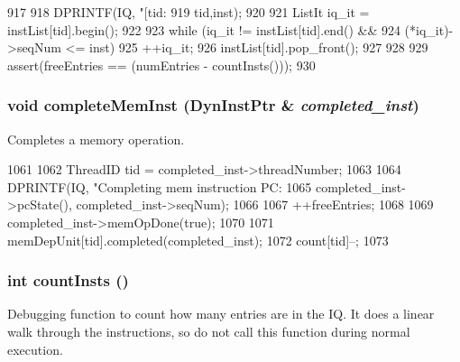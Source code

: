 \begin{DoxyCode}
917 {
918     DPRINTF(IQ, "[tid:%
919             tid,inst);
920 
921     ListIt iq_it = instList[tid].begin();
922 
923     while (iq_it != instList[tid].end() &&
924            (*iq_it)->seqNum <= inst) {
925         ++iq_it;
926         instList[tid].pop_front();
927     }
928 
929     assert(freeEntries == (numEntries - countInsts()));
930 }
\end{DoxyCode}
\hypertarget{classInstructionQueue_aad2715729f71f220e9cf9b99515384ca}{
\subsubsection[{completeMemInst}]{\setlength{\rightskip}{0pt plus 5cm}void completeMemInst ({\bf DynInstPtr} \& {\em completed\_\-inst})}}
\label{classInstructionQueue_aad2715729f71f220e9cf9b99515384ca}
Completes a memory operation. 


\begin{DoxyCode}
1061 {
1062     ThreadID tid = completed_inst->threadNumber;
1063 
1064     DPRINTF(IQ, "Completing mem instruction PC: %
1065             completed_inst->pcState(), completed_inst->seqNum);
1066 
1067     ++freeEntries;
1068 
1069     completed_inst->memOpDone(true);
1070 
1071     memDepUnit[tid].completed(completed_inst);
1072     count[tid]--;
1073 }
\end{DoxyCode}
\hypertarget{classInstructionQueue_ab654970f03abd90f0c397bba8e218bc9}{
\subsubsection[{countInsts}]{\setlength{\rightskip}{0pt plus 5cm}int countInsts ()}}
\label{classInstructionQueue_ab654970f03abd90f0c397bba8e218bc9}
Debugging function to count how many entries are in the IQ. It does a linear walk through the instructions, so do not call this function during normal execution. 



